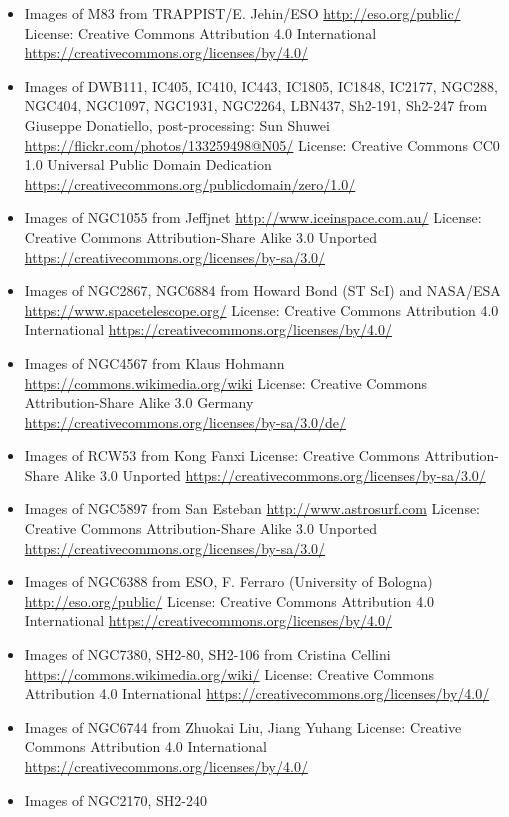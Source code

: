 \begin{itemize}
\item Images of M83
	 from TRAPPIST/E. Jehin/ESO
	 \url{http://eso.org/public/}
	 License: Creative Commons Attribution 4.0 International \url{https://creativecommons.org/licenses/by/4.0/} 
\item Images of DWB111, IC405, IC410, IC443, IC1805, IC1848, IC2177,
	 NGC288, NGC404, NGC1097, NGC1931, NGC2264, LBN437, Sh2-191, Sh2-247
	 from Giuseppe Donatiello, post-processing: Sun Shuwei
	 \url{https://flickr.com/photos/133259498@N05/}
	 License: Creative Commons CC0 1.0 Universal Public Domain Dedication \url{https://creativecommons.org/publicdomain/zero/1.0/}
\item Images of NGC1055
	 from Jeffjnet
	 \url{http://www.iceinspace.com.au/}
	 License: Creative Commons Attribution-Share Alike 3.0 Unported \url{https://creativecommons.org/licenses/by-sa/3.0/}
\item Images of NGC2867, NGC6884
	 from Howard Bond (ST ScI) and NASA/ESA
	 \url{https://www.spacetelescope.org/}
	 License: Creative Commons Attribution 4.0 International \url{https://creativecommons.org/licenses/by/4.0/} 
\item Images of NGC4567
	 from Klaus Hohmann
	 \url{https://commons.wikimedia.org/wiki}
	 License: Creative Commons Attribution-Share Alike 3.0 Germany \url{https://creativecommons.org/licenses/by-sa/3.0/de/}
\item Images of RCW53
	 from Kong Fanxi
	 License: Creative Commons Attribution-Share Alike 3.0 Unported \url{https://creativecommons.org/licenses/by-sa/3.0/}
\item Images of NGC5897
	 from San Esteban
	 \url{http://www.astrosurf.com}
	 License: Creative Commons Attribution-Share Alike 3.0 Unported \url{https://creativecommons.org/licenses/by-sa/3.0/}
\item Images of NGC6388
	 from ESO, F. Ferraro (University of Bologna)
	 \url{http://eso.org/public/}
	 License: Creative Commons Attribution 4.0 International \url{https://creativecommons.org/licenses/by/4.0/} 
\item Images of NGC7380, SH2-80, SH2-106
	 from Cristina Cellini
	 \url{https://commons.wikimedia.org/wiki/}
	 License: Creative Commons Attribution 4.0 International \url{https://creativecommons.org/licenses/by/4.0/}
\item Images of NGC6744
	 from Zhuokai Liu, Jiang Yuhang
	 License: Creative Commons Attribution 4.0 International \url{https://creativecommons.org/licenses/by/4.0/} 
\item Images of NGC2170, SH2-240

\end{itemize}
